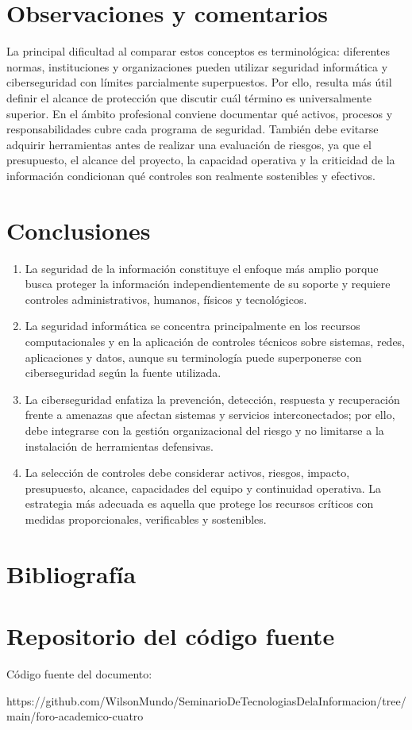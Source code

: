 \documentclass[12pt,letterpaper]{article}
\begin{document}
\section*{Observaciones y comentarios}
La principal dificultad al comparar estos conceptos es terminológica: diferentes normas, instituciones y organizaciones pueden utilizar seguridad informática y ciberseguridad con límites parcialmente superpuestos. Por ello, resulta más útil definir el alcance de protección que discutir cuál término es universalmente superior. En el ámbito profesional conviene documentar qué activos, procesos y responsabilidades cubre cada programa de seguridad. También debe evitarse adquirir herramientas antes de realizar una evaluación de riesgos, ya que el presupuesto, el alcance del proyecto, la capacidad operativa y la criticidad de la información condicionan qué controles son realmente sostenibles y efectivos.

\section*{Conclusiones}
\begin{enumerate}
    \item La seguridad de la información constituye el enfoque más amplio porque busca proteger la información independientemente de su soporte y requiere controles administrativos, humanos, físicos y tecnológicos.
    \item La seguridad informática se concentra principalmente en los recursos computacionales y en la aplicación de controles técnicos sobre sistemas, redes, aplicaciones y datos, aunque su terminología puede superponerse con ciberseguridad según la fuente utilizada.
    \item La ciberseguridad enfatiza la prevención, detección, respuesta y recuperación frente a amenazas que afectan sistemas y servicios interconectados; por ello, debe integrarse con la gestión organizacional del riesgo y no limitarse a la instalación de herramientas defensivas.
    \item La selección de controles debe considerar activos, riesgos, impacto, presupuesto, alcance, capacidades del equipo y continuidad operativa. La estrategia más adecuada es aquella que protege los recursos críticos con medidas proporcionales, verificables y sostenibles.
\end{enumerate}

\section*{Bibliografía}
\printbibliography[heading=none]


\section*{Repositorio del código fuente}
Código fuente del documento:\par
https://github.com/WilsonMundo/SeminarioDeTecnologiasDelaInformacion/tree/main/foro-academico-cuatro
\end{document}

